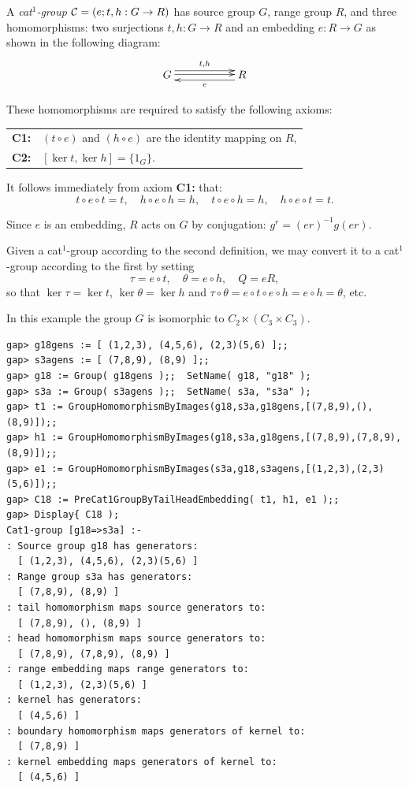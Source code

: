 \begin{defn} \label{defn:cat1-group2}
A \emph{cat$^1$-group} $\mathcal{C} = (e;t,h : G \to R)$  
has source group $G$, range group $R$, and three homomorphisms:  
two surjections  $t,h : G \to R$ and an embedding  $e : R \to G$ 
as shown in the following diagram:
$$
\xymatrix{
 G  \ar[rr] <1.0ex>^{t,h} \ar[rr] <0.2ex>
   &&  R \ar[ll] <1.0ex>^e \\
}
$$

\noindent
These homomorphisms are required to satisfy the following axioms:
\begin{center}
\begin{tabular}{r l}
\textbf{C1:}  &  $(t \circ e)$ and $(h \circ e)$ 
are the identity mapping on $R$, \\
\textbf{C2:}  &  $[\ker t, \ker h] = \{ 1_G \}$.
\end{tabular}
\end{center}
\end{defn} 

It follows immediately from axiom {\bf C1:} that: 
$$
t \circ e \circ t = t,\quad h \circ e \circ h = h,\quad 
t \circ e \circ h = h,\quad h \circ e \circ t = t.
$$

Since $e$ is an embedding, $R$ acts on $G$ by conjugation: 
$g^r = (er)^{-1}g(er)$. 

Given a cat$^1$-group according to the second definition, 
we may convert it to a cat$^1$-group according to the first by setting 
$$
\tau = e \circ t,\quad
\theta = e \circ h,\quad 
Q = eR, 
$$
so that $\ker \tau = \ker t$, $\ker \theta = \ker h$ and 
$\tau\circ\theta = e \circ t \circ e \circ h = e \circ h = \theta$, etc. 

\newpage 
\begin{example} \label{ex:C18}
In this example the group $G$ is isomorphic to $C_2 \ltimes (C_3 \times C_3)$. 
{\small 
\begin{verbatim}
gap> g18gens := [ (1,2,3), (4,5,6), (2,3)(5,6) ];;     
gap> s3agens := [ (7,8,9), (8,9) ];;                
gap> g18 := Group( g18gens );;  SetName( g18, "g18" ); 
gap> s3a := Group( s3agens );;  SetName( s3a, "s3a" );
gap> t1 := GroupHomomorphismByImages(g18,s3a,g18gens,[(7,8,9),(),(8,9)]);;     
gap> h1 := GroupHomomorphismByImages(g18,s3a,g18gens,[(7,8,9),(7,8,9),(8,9)]);;
gap> e1 := GroupHomomorphismByImages(s3a,g18,s3agens,[(1,2,3),(2,3)(5,6)]);; 
gap> C18 := PreCat1GroupByTailHeadEmbedding( t1, h1, e1 );;
gap> Display{ C18 );
Cat1-group [g18=>s3a] :- 
: Source group g18 has generators:
  [ (1,2,3), (4,5,6), (2,3)(5,6) ]
: Range group s3a has generators:
  [ (7,8,9), (8,9) ]
: tail homomorphism maps source generators to:
  [ (7,8,9), (), (8,9) ]
: head homomorphism maps source generators to:
  [ (7,8,9), (7,8,9), (8,9) ]
: range embedding maps range generators to:
  [ (1,2,3), (2,3)(5,6) ]
: kernel has generators:
  [ (4,5,6) ]
: boundary homomorphism maps generators of kernel to:
  [ (7,8,9) ]
: kernel embedding maps generators of kernel to:
  [ (4,5,6) ]
\end{verbatim}} 
\end{example} 

